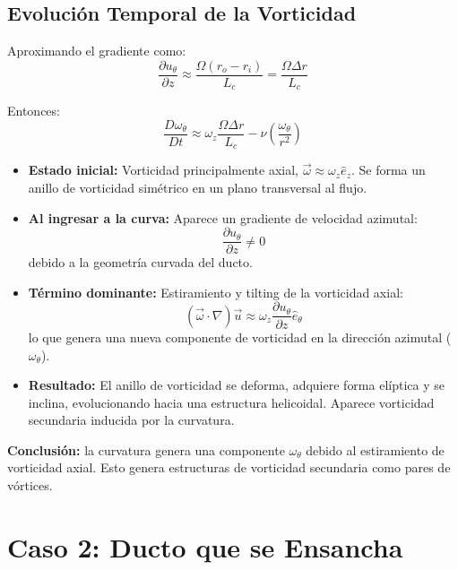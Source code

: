 \documentclass{article}
\begin{document}
\subsection{Evolución Temporal de la Vorticidad}
Aproximando el gradiente como:
\begin{equation}
    \frac{\partial u_\theta}{\partial z} \approx \frac{\Omega (r_o - r_i)}{L_c} = \frac{\Omega \Delta r}{L_c}
\end{equation}

Entonces:
\begin{equation}
    \frac{D\omega_\theta}{Dt} \approx \omega_z \frac{\Omega \Delta r}{L_c} - \nu \left(\frac{\omega_\theta}{r^2}\right)
\end{equation}


\begin{itemize}
    \item \textbf{Estado inicial:} Vorticidad principalmente axial, $\vec{\omega} \approx \omega_z \hat{e}_z$. Se forma un anillo de vorticidad simétrico en un plano transversal al flujo.
    
    \item \textbf{Al ingresar a la curva:} Aparece un gradiente de velocidad azimutal:
    \[
    \frac{\partial u_\theta}{\partial z} \neq 0
    \]
    debido a la geometría curvada del ducto.
    
    \item \textbf{Término dominante:} Estiramiento y tilting de la vorticidad axial:
    \[
    (\vec{\omega} \cdot \nabla)\vec{u} \approx \omega_z \frac{\partial u_\theta}{\partial z} \hat{e}_\theta
    \]
    lo que genera una nueva componente de vorticidad en la dirección azimutal ($\omega_\theta$).
    
    \item \textbf{Resultado:} El anillo de vorticidad se deforma, adquiere forma elíptica y se inclina, evolucionando hacia una estructura helicoidal. Aparece vorticidad secundaria inducida por la curvatura.
\end{itemize}


\textbf{Conclusión:} la curvatura genera una componente $\omega_\theta$ debido al estiramiento de vorticidad axial. Esto genera estructuras de vorticidad secundaria como pares de vórtices.


\section{Caso 2: Ducto que se Ensancha}
\end{document}
